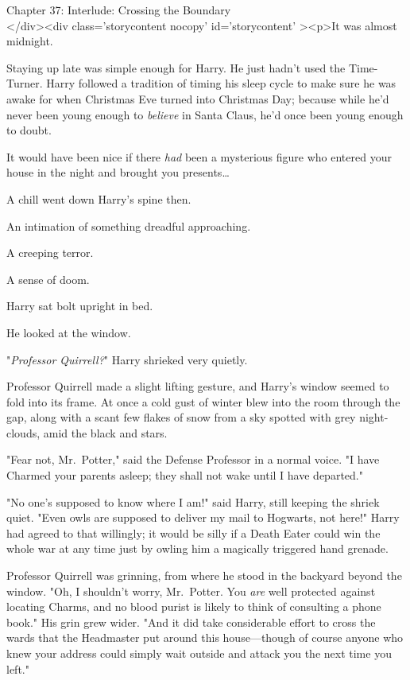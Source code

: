 
Chapter 37: Interlude: Crossing the Boundary\\
</div><div  class='storycontent nocopy' id='storycontent' ><p>It was almost 
midnight.

Staying up late was simple enough for Harry. He just hadn't used the 
Time-Turner. Harry followed a tradition of timing his sleep cycle to make sure 
he was awake for when Christmas Eve turned into Christmas Day; because while 
he'd never been young enough to \emph{believe} in Santa Claus, he'd once been 
young enough to doubt.

It would have been nice if there \emph{had} been a mysterious figure who 
entered your house in the night and brought you presents{\ldots}

A chill went down Harry's spine then.

An intimation of something dreadful approaching.

A creeping terror.

A sense of doom.

Harry sat bolt upright in bed.

He looked at the window.

"\emph{Professor Quirrell?}" Harry shrieked very quietly.

Professor Quirrell made a slight lifting gesture, and Harry's window seemed to 
fold into its frame. At once a cold gust of winter blew into the room through 
the gap, along with a scant few flakes of snow from a sky spotted with grey 
night-clouds, amid the black and stars.

"Fear not, Mr.~Potter," said the Defense Professor in a normal voice. "I have 
Charmed your parents asleep; they shall not wake until I have departed."

"No one's supposed to know where I am!" said Harry, still keeping the shriek 
quiet. "Even owls are supposed to deliver my mail to Hogwarts, not here!" Harry 
had agreed to that willingly; it would be silly if a Death Eater could win the 
whole war at any time just by owling him a magically triggered hand grenade.

Professor Quirrell was grinning, from where he stood in the backyard beyond the 
window. "Oh, I shouldn't worry, Mr.~Potter. You \emph{are} well protected 
against locating Charms, and no blood purist is likely to think of consulting a 
phone book." His grin grew wider. "And it did take considerable effort to cross 
the wards that the Headmaster put around this house---though of course anyone 
who knew your address could simply wait outside and attack you the next time 
you left."

